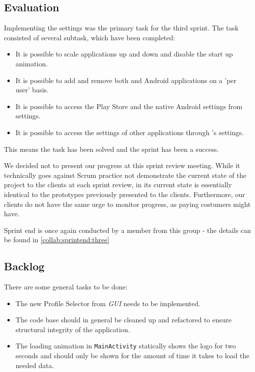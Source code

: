 \subsection{Evaluation}
Implementing the settings was the primary task for the third sprint.
The task consisted of several subtask, which have been completed:

\begin{itemize}
\item It is possible to scale applications up and down and disable the start up animation.
\item It is possible to add and remove both \giraf and Android applications on a 'per user' basis.
\item It is possible to access the Play Store and the native Android settings from settings.
\item It is possible to access the settings of other \giraf applications through \launcher 's settings.
\end{itemize}

This means the task has been solved and the sprint has been a success. 

We decided not to present our progress at this sprint review meeting. While it technically goes against Scrum practice not demonstrate the current state of the project to the clients at each sprint review, \settingsactivity in its current state is essentially identical to the prototypes previously presented to the clients. Furthermore, our clients do not have the same urge to monitor progress, as paying costumers might have.

Sprint end is once again conducted by a member from this group - the details can be found in \cref{collab:sprintend:three}

\subsection{Backlog}

There are some general tasks to be done:

\begin{itemize}
\item The new Profile Selector from \textit{GUI} needs to be implemented.
\item The code base should in general be cleaned up and refactored to ensure structural integrity of the application.
\item The loading animation in \lstinline!MainActivity! statically shows the logo for two seconds and should only be shown for the amount of time it takes to load the needed data.
\end{itemize}

